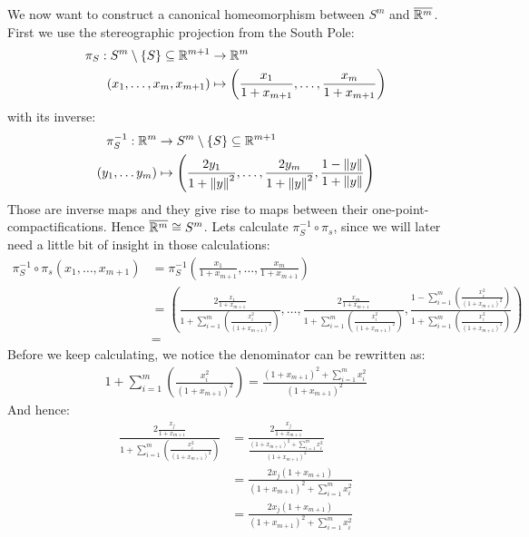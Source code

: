 \begin{remark}
    We now want to construct a canonical homeomorphism between $S^m$ and $\overline{\mathbb{R}^m}$. First we use the stereographic projection from the South Pole:
    \begin{align*}
        \pi_S:S^m\setminus \{S\}\subseteq \mathbb{R}^{m+1} &\to       \mathbb{R}^m\\
        (x_1,\dots,x_m,x_{m+1})                            &\mapsto   \left(\frac{x_1}{1+x_{m+1}},\dots, \frac{x_m}{1+x_{m+1}} \right)
    \end{align*} with its inverse: 
    \begin{align*}
        \pi_S^{-1}:\mathbb{R}^m       &\to     S^m\setminus\{S\}\subseteq \mathbb{R}^{m+1}\\
        (y_1,\dots y_m)       &\mapsto  \left(\frac{2y_1}{1+\left\lVert y\right\rVert^2},\dots,\frac{2y_m}{1+\left\lVert y\right\rVert^2},\frac{1-\left\lVert y\right\rVert}{1+\left\lVert y\right\rVert} \right)
    \end{align*}
    Those are inverse maps and they give rise to maps between their one-point-compactifications. Hence $\overline{\mathbb{R}^m}\cong S^m$. Lets calculate $\pi_S^{-1}\circ \pi_s$, since we will later need a little bit of insight in those calculations:
    \begin{align*}
        \pi_S^{-1}\circ \pi_s(x_1,\dots ,x_{m+1})
        &= \pi_S^{-1}\left(\frac{x_1}{1+x_{m+1}},\dots, \frac{x_m}{1+x_{m+1}} \right)\\
        &= \left(\frac{2\frac{x_1}{1+x_{m+1}}}{1+\sum_{i=1}^m(\frac{x_i^2}{(1+x_{m+1})^2})},\dots, \frac{2\frac{x_m}{1+x_{m+1}}}{1+\sum_{i=1}^m(\frac{x_i^2}{(1+x_{m+1})^2})},\frac{1-\sum_{i=1}^m(\frac{x_i^2}{(1+x_{m+1})^2})}{1+\sum_{i=1}^m(\frac{x_i^2}{(1+x_{m+1})^2})} \right)\\
        &=
    \end{align*} Before we keep calculating, we notice the denominator can be rewritten as:
    \begin{align*}
        1+\sum_{i=1}^m(\frac{x_i^2}{(1+x_{m+1})^2})=\frac{(1+x_{m+1})^2+\sum_{i=1}^m x_i^2}{(1+x_{m+1})^2}
    \end{align*} And hence:
    \begin{align}
        \frac{2\frac{x_j}{1+x_{m+1}}}{1+\sum_{i=1}^m(\frac{x_i^2}{(1+x_{m+1})^2})}& = \frac{2\frac{x_j}{1+x_{m+1}}}{\frac{(1+x_{m+1})^2+\sum_{i=1}^m x_i^2}{(1+x_{m+1})^2}} \\
        & =\frac{2x_j(1+x_{m+1})}{(1+x_{m+1})^2+\sum_{i=1}^m x_i^2} \\
        & =\frac{2x_j(1+x_{m+1})}{(1+x_{m+1})^2+\sum_{i=1}^m x_i^2}\\

\end{align}
\end{remark}
